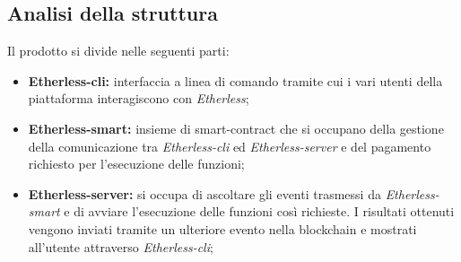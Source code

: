 \subsection{Analisi della struttura}
Il prodotto si divide nelle seguenti parti: 
\begin{itemize}
	\item \textbf{Etherless-cli:} interfaccia a linea di comando tramite cui i vari utenti della piattaforma interagiscono con \textit{Etherless}; 
	\item \textbf{Etherless-smart:} insieme di smart-contract che si occupano della gestione della comunicazione tra \textit{Etherless-cli} ed \textit{Etherless-server} e del pagamento richiesto per l'esecuzione delle funzioni; 
	\item \textbf{Etherless-server:} si occupa di ascoltare gli eventi trasmessi da \textit{Etherless-smart} e di avviare l'esecuzione delle funzioni così richieste. I risultati ottenuti vengono inviati tramite un ulteriore evento nella blockchain e mostrati all'utente attraverso \textit{Etherless-cli};  
\end{itemize}

